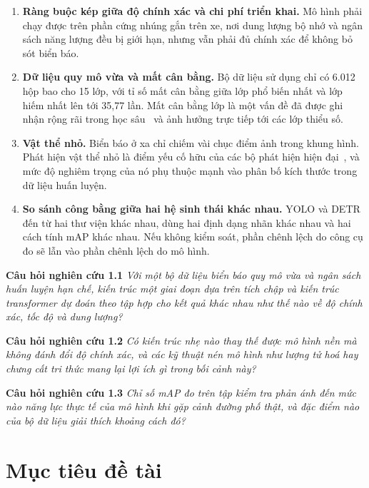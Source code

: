 \begin{enumerate}[leftmargin=1.5cm]
\item \textbf{Ràng buộc kép giữa độ chính xác và chi phí triển khai.} Mô hình phải chạy được trên
phần cứng nhúng gắn trên xe, nơi dung lượng bộ nhớ và ngân sách năng lượng đều bị giới hạn, nhưng
vẫn phải đủ chính xác để không bỏ sót biển báo.

\item \textbf{Dữ liệu quy mô vừa và mất cân bằng.} Bộ dữ liệu sử dụng chỉ có 6.012 hộp bao cho 15
lớp, với tỉ số mất cân bằng giữa lớp phổ biến nhất và lớp hiếm nhất lên tới 35,77 lần. Mất cân
bằng lớp là một vấn đề đã được ghi nhận rộng rãi trong học sâu~\cite{johnson2019imbalance} và ảnh
hưởng trực tiếp tới các lớp thiểu số.

\item \textbf{Vật thể nhỏ.} Biển báo ở xa chỉ chiếm vài chục điểm ảnh trong khung hình. Phát hiện
vật thể nhỏ là điểm yếu cố hữu của các bộ phát hiện hiện đại~\cite{tong2020smallobject}, và mức
độ nghiêm trọng của nó phụ thuộc mạnh vào phân bố kích thước trong dữ liệu huấn luyện.

\item \textbf{So sánh công bằng giữa hai hệ sinh thái khác nhau.} YOLO và DETR đến từ hai thư viện
khác nhau, dùng hai định dạng nhãn khác nhau và hai cách tính mAP khác nhau. Nếu không kiểm soát,
phần chênh lệch do công cụ đo sẽ lẫn vào phần chênh lệch do mô hình.
\end{enumerate}

\noindent\textbf{Câu hỏi nghiên cứu 1.1} \textit{Với một bộ dữ liệu biển báo quy mô vừa và ngân
sách huấn luyện hạn chế, kiến trúc một giai đoạn dựa trên tích chập và kiến trúc transformer dự
đoán theo tập hợp cho kết quả khác nhau như thế nào về độ chính xác, tốc độ và dung lượng?}

\noindent\textbf{Câu hỏi nghiên cứu 1.2} \textit{Có kiến trúc nhẹ nào thay thế được mô hình nền
mà không đánh đổi độ chính xác, và các kỹ thuật nén mô hình như lượng tử hoá hay chưng cất tri
thức mang lại lợi ích gì trong bối cảnh này?}

\noindent\textbf{Câu hỏi nghiên cứu 1.3} \textit{Chỉ số mAP đo trên tập kiểm tra phản ánh đến mức
nào năng lực thực tế của mô hình khi gặp cảnh đường phố thật, và đặc điểm nào của bộ dữ liệu giải
thích khoảng cách đó?}

\section{Mục tiêu đề tài}

